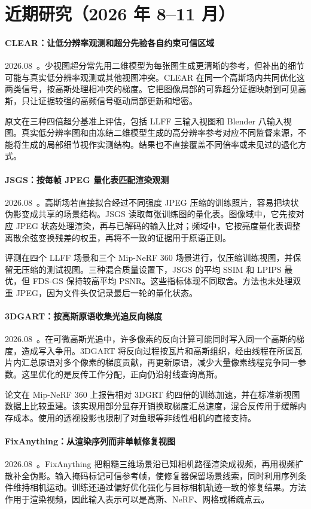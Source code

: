 \section{近期研究（2026 年 8--11 月）}
\paragraph{CLEAR：让低分辨率观测和超分先验各自约束可信区域}
2026.08~\cite{2608_02206}。少视图超分常先用二维模型为每张图生成更清晰的参考，但补出的细节可能与真实低分辨率观测或其他视图冲突。CLEAR 在同一个高斯场内共同优化这两类信号，按高斯处理相冲突的梯度。它把图像局部的可靠超分证据映射到可见高斯，只让证据较强的高频信号驱动局部更新和增密。

原文在三种四倍超分基准上评估，包括 LLFF 三输入视图和 Blender 八输入视图。真实低分辨率图和由冻结二维模型生成的高分辨率参考对应不同监督来源，不能将生成的局部细节视作实测结构。结果也不直接覆盖不同倍率或未见过的退化方式。

\paragraph{JSGS：按每帧 JPEG 量化表匹配渲染观测}
2026.08~\cite{2608_08659}。高斯场若直接拟合经过不同强度 JPEG 压缩的训练照片，容易把块状伪影变成共享的场景结构。JSGS 读取每张训练图的量化表。图像域中，它先按对应 JPEG 状态处理渲染，再与已解码的输入比对；频域中，它按亮度量化表调整离散余弦变换残差的权重，再将不一致的证据用于原语正则。

评测在四个 LLFF 场景和三个 Mip-NeRF 360 场景进行，仅压缩训练视图，并保留无压缩的测试视图。三种混合质量设置下，JSGS 的平均 SSIM 和 LPIPS 最优，但 FDS-GS 保持较高平均 PSNR。这些指标体现不同取舍。方法也未处理双重 JPEG，因为文件头仅记录最后一轮的量化状态。

\paragraph{3DGART：按高斯原语收集光追反向梯度}
2026.08~\cite{2608_17298}。在可微高斯光追中，许多像素的反向计算可能同时写入同一个高斯的梯度，造成写入争用。3DGART 将反向过程按瓦片和高斯组织，经由线程在所属瓦片内汇总原语对多个像素的梯度贡献，再更新原语，减少大量像素线程竞争同一参数。这里优化的是反传工作分配，正向仍沿射线查询高斯。

论文在 Mip-NeRF 360 上报告相对 3DGRT 约四倍的训练加速，并在标准新视图数据上比较重建。该实现用部分显存开销换取梯度汇总速度，混合反传用于缓解内存成本。使用的透视投影也限制了对鱼眼等非线性相机的直接支持。

\paragraph{FixAnything：从渲染序列而非单帧修复视图}
2026.08~\cite{2608_23549}。FixAnything 把粗糙三维场景沿已知相机路径渲染成视频，再用视频扩散补全伪影。输入掩码标记可信参考帧，使修复器保留场景线索，同时利用序列条件维持相机运动。训练还通过偏好优化强化与目标相机轨迹一致的修复结果。方法作用于渲染视频，因此输入表示可以是高斯、NeRF、网格或稀疏点云。

